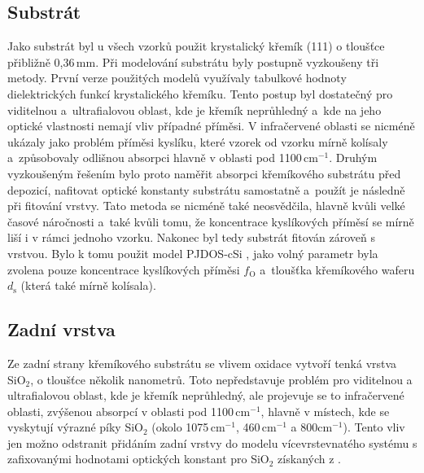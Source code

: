 \subsection{Substrát}
Jako substrát byl u všech vzorků použit krystalický křemík (111) o tloušťce přibližně 0,36\,mm. Při modelování substrátu byly postupně vyzkoušeny tři metody. První verze použitých modelů využívaly tabulkové hodnoty dielektrických funkcí krystalického kře\-mí\-ku. Tento postup byl dostatečný pro viditelnou a~ultrafialovou oblast, kde je křemík neprůhledný a~kde na jeho optické vlastnosti nemají vliv případné příměsi. V infračervené oblasti se nicméně ukázaly jako problém příměsi kyslíku, které vzorek od vzorku mírně kolísaly a~způsobovaly odlišnou absorpci hlavně v oblasti pod 1100\,cm$^{-1}$. Druhým vyzkoušeným řešením bylo proto naměřit absorpci křemíkového substrátu před depozicí, nafitovat optické konstanty substrátu samostatně a~použít je následně při fitování vrstvy. Tato metoda se nicméně také neosvědčila, hlavně kvůli velké časové náročnosti a~také kvůli tomu, že koncentrace kyslíkových příměsí se mírně liší i v rámci jednoho vzorku.
Nakonec byl tedy substrát fitován zároveň s vrstvou. Bylo k tomu použit model PJDOS-cSi \cite{}, jako volný parametr byla zvolena pouze koncentrace kyslíkových příměsi $f_\mathrm{O}$ a~tloušťka křemíkového waferu $d_\mathrm{s}$ (která také mírně kolísala).  

\subsection{Zadní vrstva}
Ze zadní strany křemíkového substrátu se vlivem oxidace vytvoří tenká vrstva SiO$_2$, o tloušťce několik nanometrů. Toto nepředstavuje problém pro viditelnou a ultrafialovou oblast, kde je křemík neprůhledný, ale projevuje se to infračervené oblasti, zvýšenou absorpcí v oblasti pod 1100\,cm$^{-1}$, hlavně v místech, kde se vyskytují výrazné píky SiO$_2$ (okolo 1075\,cm$^{-1}$, 460\,cm$^{-1}$ a 800cm$^{-1}$). Tento vliv jen možno odstranit přidáním zadní vrstvy do modelu vícevrstevnatého systému s zafixovanými hodnotami optických konstant pro SiO$_2$ získaných z \cite{Palik1985}.

\cleardoublepage
